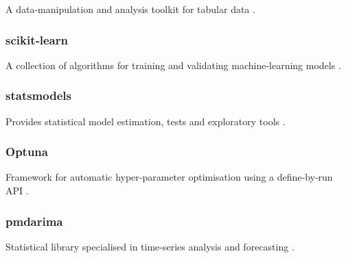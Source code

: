 
A data‑manipulation and analysis toolkit for tabular data \cite{pandas}.

\subsubsection*{scikit‑learn}


A collection of algorithms for training and validating machine‑learning models \cite{scikit-learn}.

\subsubsection*{statsmodels}


Provides statistical model estimation, tests and exploratory tools \cite{statsmodels}.

\subsubsection*{Optuna}


Framework for automatic hyper‑parameter optimisation using a define‑by‑run API \cite{optuna}.

\subsubsection*{pmdarima}


Statistical library specialised in time‑series analysis and forecasting \cite{pmdarima}.


